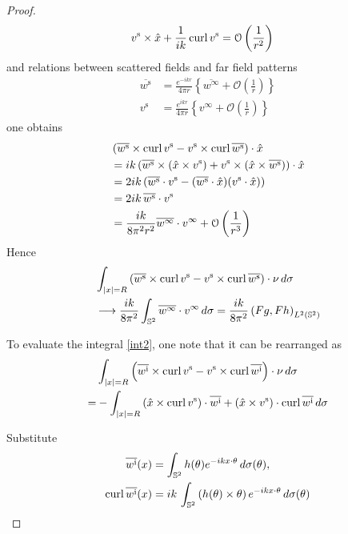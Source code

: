 \begin{proof}
\begin{align}
    v^\text{s}\times\hat{x} + \frac{1}{ik} \operatorname{curl}{v^\text{s}} &= \mathcal{O}\left(\frac{1}{r^2}\right) 
  \end{align}
  and relations between scattered fields and far field patterns
  \begin{align*}
    \overline{w^\text{s}} &= \frac{e^{-ikr}}{4\pi r}\left\{\overline{w^\infty} + \mathcal{O}\left(\frac{1}{r}\right)\right\} \\
    v^\text{s} &= \frac{e^{ikr}}{4\pi r}\left\{v^\infty + \mathcal{O}\left(\frac{1}{r}\right)\right\} 
  \end{align*}
  one obtains
  \begin{align*}
    &\left(\overline{w^\text{s}}\times\operatorname{curl}{v^\text{s}} - v^\text{s}\times\operatorname{curl}{\overline{w^\text{s}}}\right)\cdot\hat{x}\\
    &=ik\left(\overline{w^\text{s}}\times(\hat{x}\times v^\text{s})+v^\text{s}\times(\hat{x}\times\overline{w^\text{s}})\right)\cdot\hat{x} \\
    &=2ik\left(\overline{w^\text{s}}\cdot v^\text{s}-(\overline{w^\text{s}}\cdot\hat{x})(v^\text{s}\cdot\hat{x}\right))\\
    &=2ik\,\overline{w^\text{s}}\cdot v^\text{s}\\
    &=\frac{ik}{8\pi^2 r^2} \overline{w^\infty}\cdot v^\infty + \mathcal{O}\left(\frac{1}{r^3}\right)
  \end{align*}
  Hence
  \begin{align*}
    &\int_{|x|=R}\left(\overline{w^\text{s}}\times\operatorname{curl}{v^\text{s}} - v^\text{s}\times\operatorname{curl}{\overline{w^\text{s}}}\right)\cdot\nu\,d\sigma\\ 
    &\longrightarrow \frac{ik}{8\pi^2}\int_{\mathbb{S}^2}\overline{w^\infty}\cdot v^\infty\,d\sigma =\frac{ik}{8\pi^2}\left(Fg, Fh\right)_{L^2(\mathbb{S}^2)}
  \end{align*}

  To evaluate the integral \eqref{int2}, one note that it can be rearranged as
  \begin{align}
    &\int_{|x|=R}\left(\overline{w^\text{i}}\times\operatorname{curl}{v^\text{s}} - v^\text{s}\times\operatorname{curl}{\overline{w^\text{i}}}\right)\cdot\nu\,d\sigma \\
    =&-\int_{|x|=R}\left(\hat{x}\times\operatorname{curl}{v^\text{s}}\right)\cdot\overline{w^\text{i}}+\left(\hat{x}\times v^\text{s}\right)\cdot\operatorname{curl}{\overline{w^\text{i}}}\,d\sigma \label{int2a}
  \end{align}

  Substitute  
  \begin{align*}
    \overline{w^\text{i}}(x) &= \int_{\mathbb{S}^2}h(\theta) e^{-i k x\cdot\theta}\, d\sigma(\theta), \\
    \operatorname{curl}{\overline{w^\text{i}}(x)} &= ik\, \int_{\mathbb{S}^2}\left(h(\theta)\times\theta\right) e^{-i k x\cdot\theta}\, d\sigma(\theta)
  \end{align*}
  

\end{proof}
